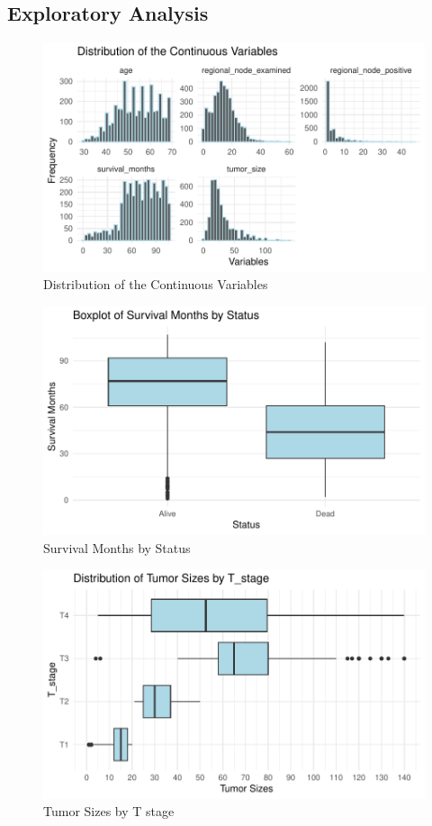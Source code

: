 \documentclass[
]{article}
\begin{document}
\newpage

\subsection{Exploratory Analysis}\label{exploratory-analysis}

\begin{figure}
\includegraphics[width=0.9\linewidth]{Appendix_files/figure-latex/distribution_of_the_continuous_variables-1} \caption{Distribution of the Continuous Variables}\label{fig:distribution_of_the_continuous_variables}
\end{figure}

\begin{figure}
\includegraphics[width=0.9\linewidth]{Appendix_files/figure-latex/survival_months_by_status-1} \caption{Survival Months by Status}\label{fig:survival_months_by_status}
\end{figure}

\begin{figure}
\includegraphics[width=0.9\linewidth]{Appendix_files/figure-latex/tumor_sizes_by_t_stage-1} \caption{Tumor Sizes by T stage}\label{fig:tumor_sizes_by_t_stage}
\end{figure}
\end{document}
